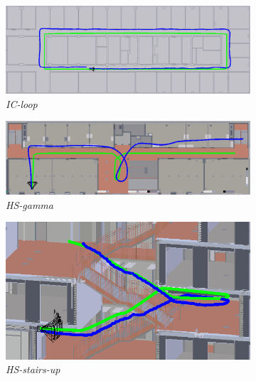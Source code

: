 \begin{figure}
	\centering
	\begin{subfigure}[t]{1.0\linewidth}
		\centering
		\includegraphics[width=\linewidth]{images/trajectories/ic_traj.png}
		\caption{\textit{IC-loop}}
		\label{subfig:traj_ic}
	\end{subfigure}
	\hfill \medskip
	\begin{subfigure}[t]{1.0\linewidth}
		\centering
		\includegraphics[width=\linewidth]{images/trajectories/hs_gamma.png}
		\caption{\textit{HS-gamma}}
		\label{subfig:traj_hs_gamma}
	\end{subfigure}
	\hfill \medskip
	\begin{subfigure}[tr]{0.45\linewidth}
		\flushleft
		\includegraphics[width=\linewidth]{images/trajectories/hs_up.png}
		\caption{\textit{HS-stairs-up}}
		\label{subfig:traj_hs-up}
	\end{subfigure}
	\hfill
	\begin{subfigure}[tl]{0.45\linewidth}

\end{subfigure}
\end{figure}
